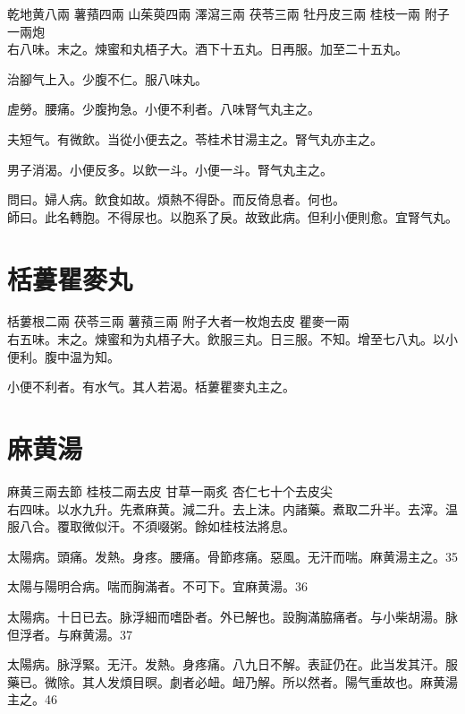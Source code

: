 乾地黄{\scriptsize 八兩} 薯蕷{\scriptsize 四兩} 山茱萸{\scriptsize 四兩} 澤瀉{\scriptsize 三兩} 茯苓{\scriptsize 三兩} 牡丹皮{\scriptsize 三兩} 桂枝{\scriptsize 一兩} 附子{\scriptsize 一兩炮}\\
右八味。末之。煉蜜和丸梧子大。酒下十五丸。日再服。{\khaai 加至二十五丸。}

治腳气上入。少腹不仁。服八味丸。

虗勞。腰痛。少腹拘急。小便不利者。八味腎气丸主之。

夫短气。有微飲。当從小便去之。苓桂术甘湯主之。腎气丸亦主之。

男子消渴。小便反多。以飲一斗。小便一斗。腎气丸主之。

問曰。婦人病。飲食如故。煩熱不得卧。而反倚息者。何也。\\
師曰。此名轉胞。不得尿也。以胞系了戾。故致此病。但利小便則愈。宜腎气丸。

\section{栝蔞瞿麥丸}

栝蔞根{\scriptsize 二兩} 茯苓{\scriptsize 三兩} 薯蕷{\scriptsize 三兩} 附子{\scriptsize 大者一枚炮去皮} 瞿麥{\scriptsize 一兩}\\
右五味。末之。煉蜜和为丸梧子大。飲服三丸。日三服。不知。增至七八丸。以小便利。腹中温为知。

小便不利者。有水气。其人若渴。栝蔞瞿麥丸主之。

\section{麻黄湯}

麻黄{\scriptsize 三兩去節} 桂枝{\scriptsize 二兩去皮} 甘草{\scriptsize 一兩炙} 杏仁{\scriptsize 七十个去皮尖}\\
右四味。以水九升。先煮麻黄。減二升。去上沫。内諸藥。煮取二升半。去滓。温服八合。覆取微似汗。不須啜粥。餘如桂枝法將息。

太陽病。頭痛。发熱。身疼。腰痛。骨節疼痛。惡風。无汗而喘。麻黄湯主之。35

太陽与陽明合病。喘而胸滿者。不可下。宜麻黄湯。36

太陽病。十日已去。脉浮細而嗜卧者。外已解也。設胸滿脇痛者。与小柴胡湯。脉{\khaai 但}浮者。与麻黄湯。37

太陽病。脉浮緊。无汗。发熱。身疼痛。八九日不解。表証仍在。此当发其汗。服藥已。微除。其人发煩目暝。劇者必衄。衄乃解。所以然者。陽气重故也。麻黄湯主之。46


